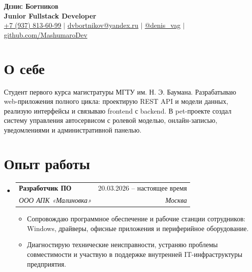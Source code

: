 \documentclass[a4paper,10pt]{article}
\makeatletter
\newcommand{\resumeItem}[1]{
  \item\small{{#1 \vspace{-2pt}}}
}
\newcommand{\resumeSubheading}[4]{
  \vspace{-2pt}\item
    \begin{tabular*}{0.97\textwidth}[t]{l@{\extracolsep{\fill}}r}
      \textbf{#1} & #2 \\
      \textit{\small #3} & \textit{\small #4} \\
    \end{tabular*}\vspace{-7pt}
}
\newcommand{\resumeSubHeadingListStart}{\begin{itemize}[leftmargin=0.15in,label={}]}
\newcommand{\resumeSubHeadingListEnd}{\end{itemize}}
\newcommand{\resumeItemListStart}{\begin{itemize}[leftmargin=0.22in]}
\newcommand{\resumeItemListEnd}{\end{itemize}\vspace{-5pt}}
\makeatother
\begin{document}
\begin{center}
  \textbf{\Huge \scshape Денис Бортников} \\ \vspace{2pt}
  \textbf{\large Junior Fullstack Developer} \\ \vspace{3pt}
  \small
  \href{tel:+79378136099}{\underline{+7 (937) 813-60-99}} $|$
  \href{mailto:dvbortnikov@yandex.ru}{\underline{dvbortnikov@yandex.ru}} $|$
  \href{https://t.me/denis_vag}{\underline{@denis\_vag}} $|$
  \href{https://github.com/MashumaroDev}{\underline{github.com/MashumaroDev}}
\end{center}

\section{О себе}
\small{
Студент первого курса магистратуры МГТУ им. Н. Э. Баумана. Разрабатываю web-приложения
полного цикла: проектирую REST API и модели данных, реализую интерфейсы и связываю
frontend с backend. В pet-проекте создал систему управления автосервисом с ролевой
моделью, онлайн-записью, уведомлениями и административной панелью.
}

\section{Опыт работы}
\resumeSubHeadingListStart
  \resumeSubheading
    {Разработчик ПО}{20.03.2026 -- настоящее время}
    {ООО АПК «Малиновка»}{Москва}
    \resumeItemListStart
      \resumeItem{Сопровождаю программное обеспечение и рабочие станции сотрудников: Windows, драйверы, офисные приложения и периферийное оборудование.}
      \resumeItem{Диагностирую технические неисправности, устраняю проблемы совместимости и участвую в поддержке внутренней IT-инфраструктуры предприятия.}
    \resumeItemListEnd
\resumeSubHeadingListEnd

\end{document}
